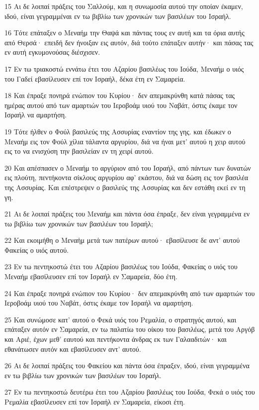 \par 15 Αι δε λοιπαί πράξεις του Σαλλούμ, και η συνωμοσία αυτού την οποίαν έκαμεν, ιδού, είναι γεγραμμέναι εν τω βιβλίω των χρονικών των βασιλέων του Ισραήλ.
\par 16 Τότε επάταξεν ο Μεναήμ την Θαψά και πάντας τους εν αυτή και τα όρια αυτής από Θερσά· επειδή δεν ήνοιξαν εις αυτόν, διά τούτο επάταξεν αυτήν· και πάσας τας εν αυτή εγκυμονούσας διέσχισεν.
\par 17 Εν τω τριακοστώ εννάτω έτει του Αζαρίου βασιλέως του Ιούδα, Μεναήμ ο υιός του Γαδεί εβασίλευσεν επί τον Ισραήλ, δέκα έτη εν Σαμαρεία.
\par 18 Και έπραξε πονηρά ενώπιον του Κυρίου· δεν απεμακρύνθη κατά πάσας τας ημέρας αυτού από των αμαρτιών του Ιεροβοάμ υιού του Ναβάτ, όστις έκαμε τον Ισραήλ να αμαρτήση.
\par 19 Τότε ήλθεν ο Φούλ βασιλεύς της Ασσυρίας εναντίον της γης. και έδωκεν ο Μεναήμ εις τον Φούλ χίλια τάλαντα αργυρίου, διά να ήναι μετ' αυτού η χειρ αυτού εις το να ενισχύση την βασιλείαν εν τη χειρί αυτού.
\par 20 Και απέσπασεν ο Μεναήμ το αργύριον από του Ισραήλ, από πάντων των δυνατών εις πλούτη, πεντήκοντα σίκλους αργυρίου αφ' εκάστου, διά να δώση εις τον βασιλέα της Ασσυρίας. Και επέστρεψεν ο βασιλεύς της Ασσυρίας και δεν εστάθη εκεί εν τη γη.
\par 21 Αι δε λοιπαί πράξεις του Μεναήμ και πάντα όσα έπραξε, δεν είναι γεγραμμένα εν τω βιβλίω των χρονικών των βασιλέων του Ισραήλ;
\par 22 Και εκοιμήθη ο Μεναήμ μετά των πατέρων αυτού· εβασίλευσε δε αντ' αυτού Φακείας ο υιός αυτού.
\par 23 Εν τω πεντηκοστώ έτει του Αζαρίου βασιλέως του Ιούδα, Φακείας ο υιός του Μεναήμ εβασίλευσεν επί τον Ισραήλ εν Σαμαρεία, δύο έτη.
\par 24 Και έπραξε πονηρά ενώπιον του Κυρίου· δεν απεμακρύνθη από των αμαρτιών του Ιεροβοάμ υιού του Ναβάτ, όστις έκαμε τον Ισραήλ να αμαρτήση.
\par 25 Και συνώμοσε κατ' αυτού ο Φεκά υιός του Ρεμαλία, ο στρατηγός αυτού, και επάταξεν αυτόν εν Σαμαρεία, εν τω παλατίω του οίκου του βασιλέως, μετά του Αργόβ και Αριέ, έχων μεθ' εαυτού και πεντήκοντα άνδρας εκ των Γαλααδιτών· και εθανάτωσεν αυτόν και εβασίλευσεν αντ' αυτού.
\par 26 Αι δε λοιπαί πράξεις του Φακείου και πάντα όσα έπραξεν, ιδού, είναι γεγραμμένα εν τω βιβλίω των χρονικών των βασιλέων του Ισραήλ.
\par 27 Εν τω πεντηκοστώ δευτέρω έτει του Αζαρίου βασιλέως του Ιούδα, Φεκά ο υιός του Ρεμαλία εβασίλευσεν επί τον Ισραήλ εν Σαμαρεία, είκοσι έτη.
